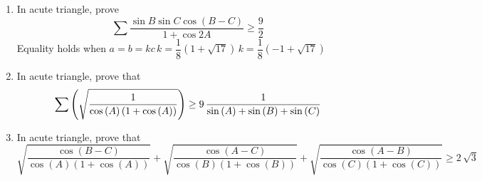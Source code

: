 \documentclass{report}
\begin{document}
\begin{enumerate}
	
	
	
	
	
	
	
	
	
	
	
	
	
	
	
	
	
	
	
	
	
	
	
	
	
	
	\item In acute triangle, prove$$\sum {\frac{\sin{B}\sin{C}\cos{(B-C)}}{1+\cos{2A}}}\geq \frac{9}{2}$$Equality holds when $a=b=kc\, k=\dfrac{1}{8}(1+\sqrt{17})\, k=\dfrac{1}{8}(-1+\sqrt{17})$
	\item In acute triangle, prove that\[{\it \sum} \left( \sqrt {{\frac {1}{\cos \left( A \right)  \left( 1+\cos \left( A \right)  \right) }}} \right) \geq 9\,{\frac {1}{\sin \left(	A \right) +\sin \left( B \right) +\sin \left( C \right) }}\]
	\item In acute triangle, prove that\[\sqrt {{\frac {\cos \left( B-C \right) }{\cos \left( A \right)			\left( 1+\cos \left( A \right)  \right) }}}+\sqrt {{\frac {\cos\left( A-C \right) }{\cos \left( B \right)  \left( 1+\cos \left( B	\right)  \right) }}}+\sqrt {{\frac {\cos \left( A-B \right) }{\cos	\left( C \right)  \left( 1+\cos \left( C \right)  \right) }}}\geq 2\,\sqrt {3}\]
\end{enumerate}
\end{document}
